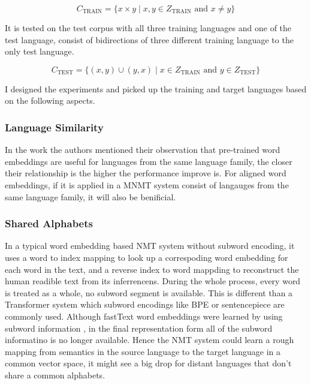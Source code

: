 \documentclass[thesis,fonts=libertine]{cluu}
\begin{document}
\begin{equation}
  C_{\text{TRAIN}} = \{x \times y \mid x, y \in Z_{\text{TRAIN}} \text{ and } x \neq y\}
\end{equation}

It is tested on the test corpus with all three training languages and one of the test language, consist of bidirections of three different training language to the only test language.

\begin{equation}
  C_{\text{TEST}} = \{(x, y)\cup(y,x) \mid x \in Z_{\text{TRAIN}} \text{ and } y \in Z_{\text{TEST}}\}
\end{equation}

I designed the experiments and picked up the training and target languages based on the following aspects.

\subsubsection{Language Similarity}

In the work \cite{Qi:2018aa} the authors mentioned their observation that pre-trained word embeddings are useful for languages from the same language family, the closer their relationship is the higher the performance improve is. For aligned word embeddings, if it is applied in a MNMT system consist of langauges from the same language family, it will also be benificial.

\subsubsection{Shared Alphabets}

In a typical word embedding based NMT system without subword encoding, it uses a word to index mapping to look up a correspoding word embedding for each word in the text, and a reverse index to word mappding to reconstruct the human readible text from its inferrencens. During the whole process, every word is treated as a whole, no subword segment is available. This is different than a Transformer system which subword encodings like BPE or sentencepiece are commonly used. Although fastText word embeddings were learned by using subword information \parencite{Bojanowski:2016aa}, in the final representation form all of the subword informatino is no longer available. Hence the NMT system could learn a rough mapping from semantics in the source language to the target language in a common vector space, it might see a big drop for distant languages that don't share a common alphabets.
\end{document}
